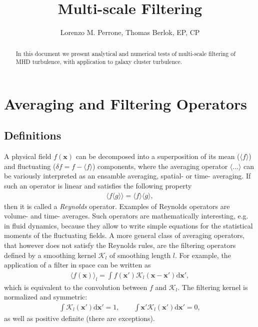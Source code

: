 \documentclass[]{article}
\title{Multi-scale Filtering}
\author{Lorenzo M. Perrone, Thomas Berlok, EP, CP}
\begin{document}
\maketitle

\begin{abstract}
In this document we present analytical and numerical tests of multi-scale filtering of MHD turbulence, with application to galaxy cluster turbulence.
\end{abstract}


\section{Averaging and Filtering Operators}

\subsection{Definitions}

A physical field $f(\bm x)$ can be decomposed into a superposition of its mean ($\langle f \rangle$) and fluctuating ($\delta f = f - \langle f \rangle$) components, where the averaging operator $\langle \ldots \rangle$ can be variously interpreted as an ensamble averaging, spatial- or time- averaging. If such an operator is linear and satisfies the following property
%
\begin{align}
	\langle f \langle g \rangle \rangle = \langle f \rangle \langle g \rangle,
\end{align}
%
then it is called a \textit{Reynolds} operator. Examples of Reynolds operators are volume- and time- averages. Such operators are mathematically interesting, e.g. in fluid dynamics, because they allow to write simple equations for the statistical moments of the fluctuating fields. A more general class of averaging operators, that however does not satisfy the Reynolds rules, are the filtering operators defined by a smoothing kernel $\mathcal{K}_l$ of smoothing length $l$. For example, the application of a filter in space can be written as
%
\begin{align}
	\langle f (\bm x) \rangle_l = \int f(\bm x') \mathcal{K}_l (\bm x - \bm x') \mathrm{d} \bm x',
\end{align}
%
which is equivalent to the convolution between $f$ and $\mathcal{K}_l$. The filtering kernel is normalized and symmetric:
%
\begin{align}
	\int \mathcal{K}_l (\bm x') \mathrm{d} \bm x' = 1, \hspace{2em} \int \bm x' \mathcal{K}_l (\bm x') \mathrm{d} \bm x' = 0,
\end{align}
%
as well as positive definite (there are exceptions).
\end{document}
